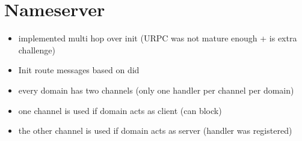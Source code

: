 \chapter{Nameserver}

\begin{itemize}
    \item implemented multi hop over init (URPC was not mature enough + is extra challenge)
    \item Init route messages based on did
    \item every domain has two channels (only one handler per channel per domain)
    \item one channel is used if domain acts as client (can block)
    \item the other channel is used if domain acts as server (handler was registered) 
\end{itemize}
